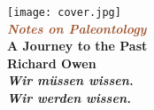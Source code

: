 \documentclass[oneside,12pt,a4paper]{memoir}
\theoremstyle{definition}
\begin{document}
\begin{titlingpage} %
    \centering %
	\setlength{\unitlength}{0.6\textwidth} %
    \parindent=0pt
    \texttt{[image: cover.jpg]} %
    \vfill
	{\color{LightGoldenrod}}\\[\baselineskip] %
	\textcolor{Sienna}{\textit{\Huge \textbf{Notes on Paleontology}}}\\[\baselineskip] %
	{\color{RosyBrown}\Large \textbf{A Journey to the Past}}\\ %
	{\color{LightGoldenrod}} %
	\vfill %
    {\Large\textbf{Richard Owen}}\\ %
    \vfill
    \textbf{\Large\textit{Wir m\"{u}ssen wissen.~\\ Wir werden wissen.}}
    \vfill
    \restoregeometry
\end{titlingpage}


\tableofcontents




\end{document}
